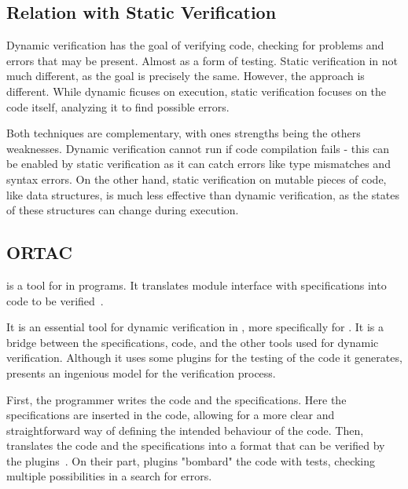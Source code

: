 \subsection{Relation with Static Verification}
\label{sub:relation_with_static_verification}

Dynamic verification has the goal of verifying code, checking for problems and errors 
that may be present. Almost as a form of testing. Static verification in not much different, 
as the goal is precisely the same. However, the approach is different. While dynamic ficuses 
on execution, static verification focuses on the code itself, analyzing it to find possible 
errors. 

Both techniques are complementary, with ones strengths being the others weaknesses.
Dynamic verification cannot run if code compilation fails - this can be enabled by static 
verification as it can catch errors like type mismatches and syntax errors. On the other hand, 
static verification on mutable pieces of code, like data structures, is much less effective 
than dynamic verification, as the states of these structures can change during execution.

\subsection{ORTAC}
\label{sub:ortac}

\ortac is a tool for \rac in \ocaml programs. It translates \ocaml module interface with 
\gospellang specifications into code to be verified~\cite{Filliatre}.

It is an essential tool for dynamic verification in \ocaml, more specifically for 
\rac. It is a bridge between the \gospellang specifications, \ocaml code, and the other tools 
used for dynamic verification. Although it uses some plugins for the testing of the code it 
generates, \ortac presents an ingenious model for the verification process.

First, the programmer writes the \ocaml code and the \gospellang specifications. Here the 
specifications are inserted in the code, allowing for a more clear and straightforward 
way of defining the intended behaviour of the code. Then, \ortac translates the code 
and the specifications into a format that can be verified by the plugins~\cite{Filliatre}. 
On their part, plugins "bombard" the code with tests, checking multiple possibilities in a 
search for errors.